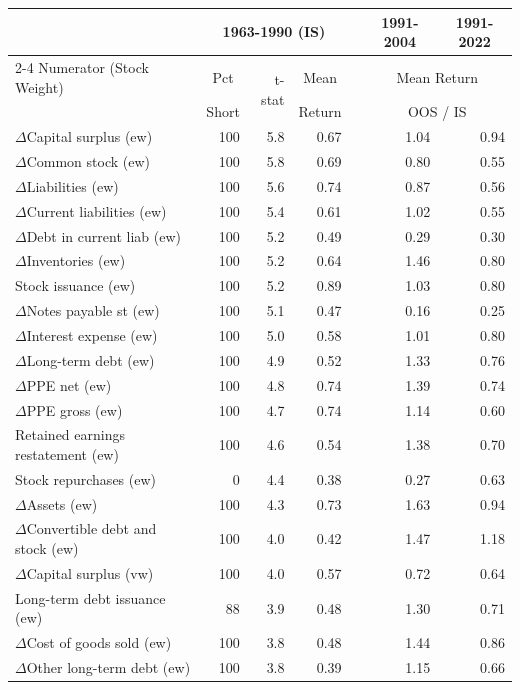 
\begin{tabular}{lrrrlrr}
\toprule
 & \multicolumn{3}{c}{1963-1990 (IS)} &  & \multicolumn{1}{c}{1991-2004} & \multicolumn{1}{c}{1991-2022} \\ \cmidrule{2-4} \cmidrule{6-7}
Numerator (Stock Weight) & \multicolumn{1}{c}{Pct} & \multirow{2}{*}{t-stat} & \multicolumn{1}{c}{Mean} &  & \multicolumn{2}{c}{Mean Return} \\  
 & \multicolumn{1}{c}{Short} &  & \multicolumn{1}{c}{Return} &  & \multicolumn{2}{c}{OOS / IS} \\ 
\midrule
$\Delta$Capital surplus (ew) & 100 & 5.8 & 0.67 &  & 1.04 & 0.94\\
$\Delta$Common stock (ew) & 100 & 5.8 & 0.69 &  & 0.80 & 0.55\\
$\Delta$Liabilities (ew) & 100 & 5.6 & 0.74 &  & 0.87 & 0.56\\
$\Delta$Current liabilities (ew) & 100 & 5.4 & 0.61 &  & 1.02 & 0.55\\
$\Delta$Debt in current liab (ew) & 100 & 5.2 & 0.49 &  & 0.29 & 0.30\\
$\Delta$Inventories (ew) & 100 & 5.2 & 0.64 &  & 1.46 & 0.80\\
Stock issuance (ew) & 100 & 5.2 & 0.89 &  & 1.03 & 0.80\\
$\Delta$Notes payable st (ew) & 100 & 5.1 & 0.47 &  & 0.16 & 0.25\\
$\Delta$Interest expense (ew) & 100 & 5.0 & 0.58 &  & 1.01 & 0.80\\
$\Delta$Long-term debt (ew) & 100 & 4.9 & 0.52 &  & 1.33 & 0.76\\
$\Delta$PPE net (ew) & 100 & 4.8 & 0.74 &  & 1.39 & 0.74\\
$\Delta$PPE gross (ew) & 100 & 4.7 & 0.74 &  & 1.14 & 0.60\\
Retained earnings restatement (ew) & 100 & 4.6 & 0.54 &  & 1.38 & 0.70\\
Stock repurchases (ew) & 0 & 4.4 & 0.38 &  & 0.27 & 0.63\\
$\Delta$Assets (ew) & 100 & 4.3 & 0.73 &  & 1.63 & 0.94\\
$\Delta$Convertible debt and stock (ew) & 100 & 4.0 & 0.42 &  & 1.47 & 1.18\\
$\Delta$Capital surplus (vw) & 100 & 4.0 & 0.57 &  & 0.72 & 0.64\\
Long-term debt issuance (ew) & 88 & 3.9 & 0.48 &  & 1.30 & 0.71\\
$\Delta$Cost of goods sold (ew) & 100 & 3.8 & 0.48 &  & 1.44 & 0.86\\
$\Delta$Other long-term debt (ew) & 100 & 3.8 & 0.39 &  & 1.15 & 0.66\\
\bottomrule
\end{tabular}
